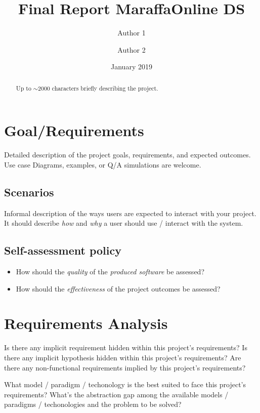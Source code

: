 \documentclass{scrartcl}
\title{\LARGE
    Final Report MaraffaOnline DS 
}
\author{
    Author 1 \\ \emailaddr{matteo.santoro@studio.unibo.it}
    \and 
    Author 2 \\ \emailaddr{sofia.tosi4@studio.unibo.it} 
}
\date{January 2019}
\begin{document}
\maketitle

\begin{abstract}
    Up to $\sim$2000 characters briefly describing the project.
\end{abstract}

\section{Goal/Requirements}

Detailed description of the project goals, requirements, and expected outcomes.
%
Use case Diagrams, examples, or Q/A simulations are welcome.

\subsection{Scenarios}

Informal description of the ways users are expected to interact with your project.
%
It should describe \emph{how} and \emph{why} a user should use / interact with the system.

\subsection{Self-assessment policy}

\begin{itemize}
    \item How should the \emph{quality} of the \emph{produced software} be assessed?
    
    \item How should the \emph{effectiveness} of the project outcomes be assessed?
\end{itemize}

\section{Requirements Analysis}

Is there any implicit requirement hidden within this project's requirements?
%
Is there any implicit hypothesis hidden within this project's requirements?
%
Are there any non-functional requirements implied by this project's requirements?

What model / paradigm / techonology is the best suited to face this project's requirements?
%
What's the abstraction gap among the available models / paradigms / techonologies and the problem to be solved?
\end{document}
